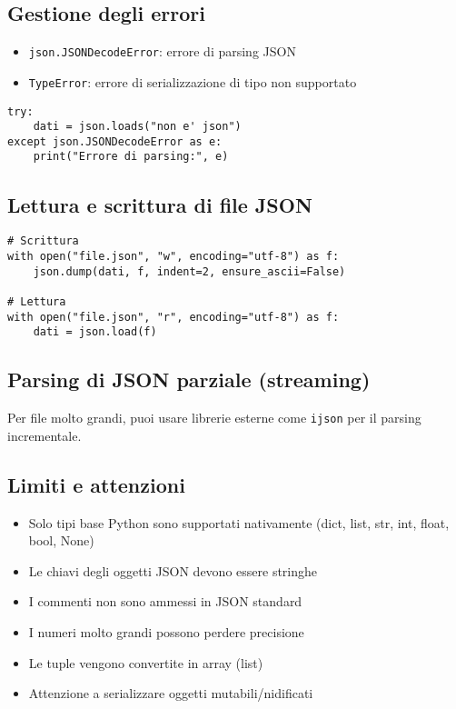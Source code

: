 \documentclass[a4paper,12pt]{article}
\begin{document}
\subsection*{Gestione degli errori}
\begin{itemize}
    \item \texttt{json.JSONDecodeError}: errore di parsing JSON
    \item \texttt{TypeError}: errore di serializzazione di tipo non supportato
\end{itemize}
\begin{lstlisting}
try:
    dati = json.loads("non e' json")
except json.JSONDecodeError as e:
    print("Errore di parsing:", e)
\end{lstlisting}

\subsection*{Lettura e scrittura di file JSON}
\begin{lstlisting}
# Scrittura
with open("file.json", "w", encoding="utf-8") as f:
    json.dump(dati, f, indent=2, ensure_ascii=False)

# Lettura
with open("file.json", "r", encoding="utf-8") as f:
    dati = json.load(f)
\end{lstlisting}

\subsection*{Parsing di JSON parziale (streaming)}
Per file molto grandi, puoi usare librerie esterne come \texttt{ijson} per il parsing incrementale.

\subsection*{Limiti e attenzioni}
\begin{itemize}
    \item Solo tipi base Python sono supportati nativamente (dict, list, str, int, float, bool, None)
    \item Le chiavi degli oggetti JSON devono essere stringhe
    \item I commenti non sono ammessi in JSON standard
    \item I numeri molto grandi possono perdere precisione
    \item Le tuple vengono convertite in array (list)
    \item Attenzione a serializzare oggetti mutabili/nidificati
\end{itemize}
\end{document}
